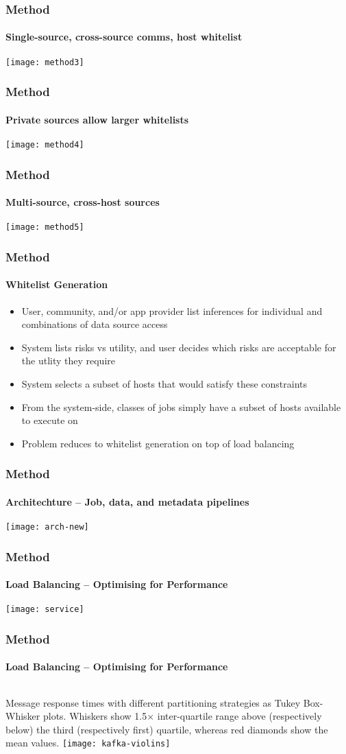 \documentclass[aspectratio=169]{beamer}
\begin{document}
\begin{frame}
	\frametitle{Method}
	\framesubtitle{Single-source, cross-source comms, host whitelist}
	\texttt{[image: method3]}
\end{frame}

\begin{frame}
	\frametitle{Method}
	\framesubtitle{Private sources allow larger whitelists}
	\texttt{[image: method4]}
\end{frame}

\begin{frame}
	\frametitle{Method}
	\framesubtitle{Multi-source, cross-host sources}
	\texttt{[image: method5]}
\end{frame}

\begin{frame}
	\frametitle{Method}
	\framesubtitle{Whitelist Generation}
	\begin{itemize}
		\item User, community, and/or app provider list inferences for individual and combinations of data source access
		\item System lists risks vs utility, and user decides which risks are acceptable for the utlity they require
		\item System selects a subset of hosts that would satisfy these constraints
		\item From the system-side, classes of jobs simply have a subset of hosts available to execute on
		\item Problem reduces to whitelist generation on top of load balancing
	\end{itemize}
\end{frame}

\begin{frame}
	\frametitle{Method}
	\framesubtitle{Architechture -- Job, data, and metadata pipelines}
	\centering
	\texttt{[image: arch-new]}
\end{frame}

\begin{frame}
	\frametitle{Method}
	\framesubtitle{Load Balancing -- Optimising for Performance}
	\centering
	\texttt{[image: service]}
\end{frame}

\begin{frame}
	\frametitle{Method}
	\framesubtitle{Load Balancing -- Optimising for Performance}
	\begin{columns}[c]
		Message response times with different partitioning strategies as Tukey Box-Whisker plots. Whiskers show 1.5$\times$ inter-quartile range above (respectively below) the third (respectively first) quartile, whereas red diamonds show the mean values.
		\texttt{[image: kafka-violins]}
	\end{columns}
\end{frame}
\end{document}

